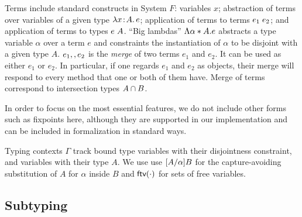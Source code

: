 Terms include standard constructs in System $F$: variables $x$; abstraction of
terms over variables of a given type $\lambda x \!:\! A.\, e$; application of terms to
terms $e_1 \; e_2$; and application of terms to types $e \; A$.
``Big lambdas'' $\Lambda \alpha * A. e$ abstracts a type variable
$\alpha$ over a term $e$ and constraints the instantiation of $\alpha$ to be
disjoint with a given type $A$. $e_1 ,, e_2$ is the \emph{merge} of two
terms $e_1$ and $e_2$. It can be used as either $ e_1 $ or $ e_2 $. In
particular, if one regards $e_1$ and $e_2$ as objects, their merge will respond
to every method that one or both of them have. Merge of terms correspond to
intersection types $A \cap B$.


In order to focus on the most essential features, we do not include other forms
such as fixpoints here, although they are supported in our implementation and
can be included in formalization in standard ways.

Typing contexts $ \Gamma $ track bound type variables with their disjointness
constraint, and variables with their type $A$. We use use $\lbrack A / \alpha \rbrack
{B}$ for the capture-avoiding substitution of $A$ for $\alpha$ inside $B$ and
$\textsf{ftv}(\cdot)$ for sets of free variables.


\subsection{Subtyping}

